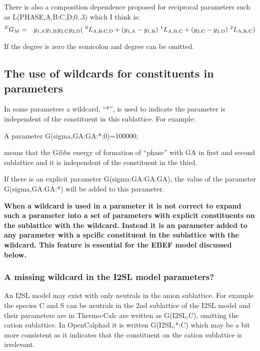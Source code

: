 \documentclass{article}
\begin{document}
There is also a composition dependence proposed for reciprocal
parameters such as L(PHASE,A,B:C,D;0..3) which I think is:
\begin{eqnarray}
  ^EG_M &=& y_{1,\rm A}y_{1,\rm B}y_{2,\rm C}y_{2,\rm D} (~^0L_{\rm A,B:C,D} +  (y_{1,\rm A}-y_{1,\rm B})~^1L_{\rm A,B,C} + (y_{2,\rm C}-y_{2,\rm D})~^2L_{\rm A,B,C})  \label{eq:hillert4}
\end{eqnarray}

If the degree is zero the semicolon and degree can be omitted.

\subsection{The use of wildcards for constituents in parameters}\label{sec:wildcard}

In some parameters a wildcard, ``*'', is used to indicate the
parameter is independent of the constituent in this sublattice.  For
example:

A parameter G(sigma,GA:GA:*;0)=100000;

\noindent
means that the Gibbs energy of formation of ``phase'' with GA in first
and second sublattice and it is independent of the constituent in the
third.

If there is an explicit parameter G(sigma:GA:GA:GA), the value of the
parameter G(sigma,GA:GA:*) will be added to this parameter.

{\bf When a wildcard is used in a parameter it is not correct to
  expand such a parameter into a set of parameters with explicit
  constituents on the sublattice with the wildcard.  Instead it is an
  parameter added to any parameter with a spcific constituent in the
  sublattice with the wildcard.  This feature is essential for the
  EBEF model discussed below.}

\subsubsection{A missing wildcard in the I2SL model parameters?}

An I2SL model may exist with only neutrals in the anion sublattice.
For example the species C and S can be neutrals in the 2nd sublattice
of the I2SL model and their parameters are in Thermo-Calc are written
as G(I2SL,C), omitting the cation sublattice.  In OpenCalphad it is
written G(I2SL,*:C) which may be a bit more consistent as it indicates
that the constituent on the cation sublattice is irrelevant.
\end{document}
